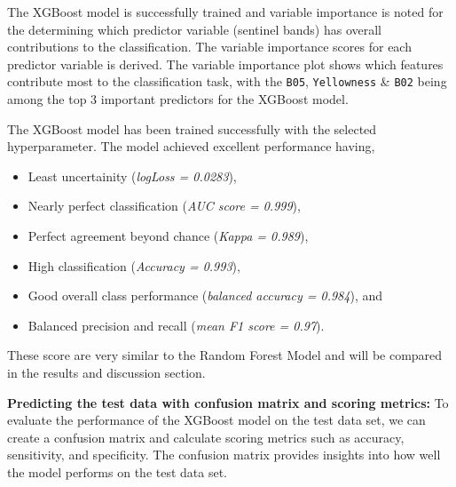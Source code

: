 \documentclass[
]{article}
\begin{document}
The XGBoost model is successfully trained and variable importance is
noted for the determining which predictor variable (sentinel bands) has
overall contributions to the classification. The variable importance
scores for each predictor variable is derived. The variable importance
plot shows which features contribute most to the classification task,
with the \texttt{B05}, \texttt{Yellowness} \& \texttt{B02} being among
the top 3 important predictors for the XGBoost model.

The XGBoost model has been trained successfully with the selected
hyperparameter. The model achieved excellent performance having,

\begin{itemize}
\item
  Least uncertainity (\emph{logLoss = 0.0283}),
\item
  Nearly perfect classification (\emph{AUC score = 0.999}),
\item
  Perfect agreement beyond chance (\emph{Kappa = 0.989}),
\item
  High classification (\emph{Accuracy = 0.993}),
\item
  Good overall class performance (\emph{balanced accuracy = 0.984}), and
\item
  Balanced precision and recall (\emph{mean F1 score = 0.97}).
\end{itemize}

These score are very similar to the Random Forest Model and will be
compared in the results and discussion section.

\textbf{Predicting the test data with confusion matrix and scoring
metrics:} To evaluate the performance of the XGBoost model on the test
data set, we can create a confusion matrix and calculate scoring metrics
such as accuracy, sensitivity, and specificity. The confusion matrix
provides insights into how well the model performs on the test data set.
\end{document}
